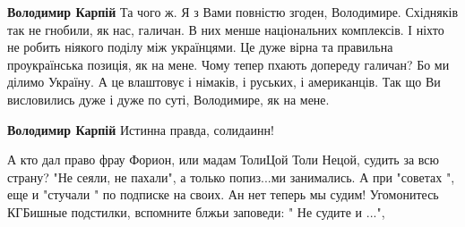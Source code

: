 \begin{itemize}
\begin{itemize}
\textbf{Володимир Карпій} Та чого ж. Я з Вами повністю згоден, Володимире.
Східняків так не гнобили, як нас, галичан. В них менше національних комплексів.
І ніхто не робить ніякого поділу між українцями. Це дуже вірна та правильна
проукраїнська позиція, як на мене. Чому тепер пхають допереду галичан? Бо ми
ділимо Україну. А це влаштовує і німаків, і руських, і американців. Так що Ви
висловились дуже і дуже по суті, Володимире, як на мене.

 
\textbf{Володимир Карпій} Истинна правда, солидаинн!

\end{itemize}


А кто дал право фрау Форион, или мадам ТолиЦой Толи Нецой, судить за всю
страну? "Не сеяли, не пахали", а только попиз...ми занимались. А при "советах
", еще и "стучали " по подписке на своих. Ан нет теперь мы судим! Угомонитесь
КГБишные подстилки, вспомните блжьи заповеди: " Не судите и ...",
\end{itemize}

